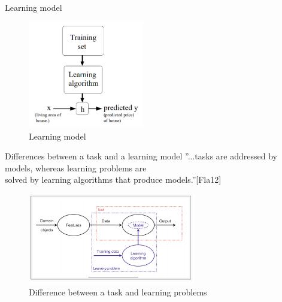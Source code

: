 \documentclass{beamer}
\begin{document}
\begin{frame}{Learning model}
\begin{figure}
  \centering
    \includegraphics[width=0.45\textwidth]{learningalgorithm}
  		\caption{ Learning model }
    \label{lmodel}
 \end{figure}
\end{frame}

\begin{frame}{ Differences between a task and a learning model }
	”...tasks are addressed by models, whereas learning problems are \\ 
	solved by learning algorithms that produce models.”[Fla12]
  \begin{figure}
  \centering
    \includegraphics[width=0.65\textwidth]{addressingtask}
  		\caption{ Difference between a task and learning problems }
    \label{addressingtask}
 \end{figure}
\end{frame}

\end{document}
